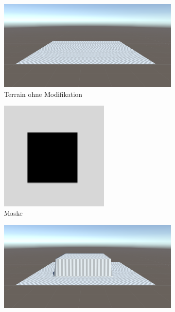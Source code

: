 \begin{figure}
    \centering\hfill
    \begin{subfigure}[b]{0.4\textwidth}
        \centering        
        \includegraphics[width = \textwidth]{resources/img/wg/wgtmod_s.png}
        \caption{Terrain ohne Modifikation}
    \end{subfigure}
    \hspace{2bp}
    \begin{subfigure}[b]{0.4\textwidth}
        \centering
        \includegraphics[width = 0.6\textwidth]{resources/img/wg/wgtmod_examplemask.png}
        \caption{Maske}
    \end{subfigure}\vfill\hfill
    \begin{subfigure}[b]{0.4\textwidth}
        \centering        
        \includegraphics[width = \textwidth]{resources/img/wg/wgtmod_setbymask.png}

\end{subfigure}
\end{figure}
